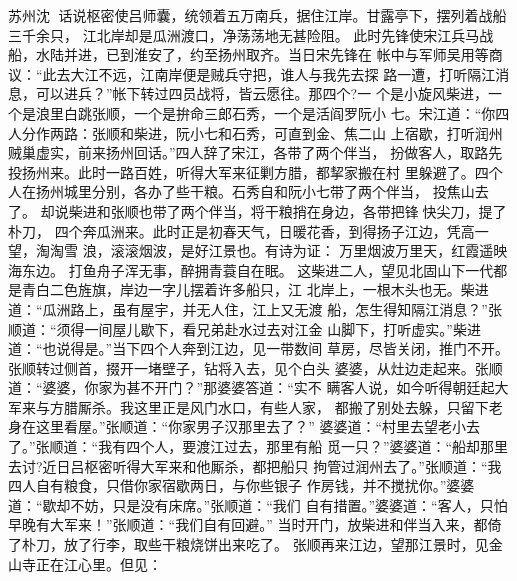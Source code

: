 苏州沈
话说枢密使吕师囊，统领着五万南兵，据住江岸。甘露亭下，摆列着战船三千余只，
江北岸却是瓜洲渡口，净荡荡地无甚险阻。
此时先锋使宋江兵马战船，水陆并进，已到淮安了，约至扬州取齐。当日宋先锋在
帐中与军师吴用等商议：“此去大江不远，江南岸便是贼兵守把，谁人与我先去探
路一遭，打听隔江消息，可以进兵？”帐下转过四员战将，皆云愿往。那四个?一
个是小旋风柴进，一个是浪里白跳张顺，一个是拚命三郎石秀，一个是活阎罗阮小
七。宋江道：“你四人分作两路：张顺和柴进，阮小七和石秀，可直到金、焦二山
上宿歇，打听润州贼巢虚实，前来扬州回话。”四人辞了宋江，各带了两个伴当，
扮做客人，取路先投扬州来。此时一路百姓，听得大军来征剿方腊，都挈家搬在村
里躲避了。四个人在扬州城里分别，各办了些干粮。石秀自和阮小七带了两个伴当，
投焦山去了。
却说柴进和张顺也带了两个伴当，将干粮捎在身边，各带把锋快尖刀，提了朴刀，
四个奔瓜洲来。此时正是初春天气，日暖花香，到得扬子江边，凭高一望，淘淘雪
浪，滚滚烟波，是好江景也。有诗为证：
万里烟波万里天，红霞遥映海东边。
打鱼舟子浑无事，醉拥青蓑自在眠。
这柴进二人，望见北固山下一代都是青白二色旌旗，岸边一字儿摆着许多船只，江
北岸上，一根木头也无。柴进道：“瓜洲路上，虽有屋宇，并无人住，江上又无渡
船，怎生得知隔江消息？”张顺道：“须得一间屋儿歇下，看兄弟赴水过去对江金
山脚下，打听虚实。”柴进道：“也说得是。”当下四个人奔到江边，见一带数间
草房，尽皆关闭，推门不开。张顺转过侧首，掇开一堵壁子，钻将入去，见个白头
婆婆，从灶边走起来。张顺道：“婆婆，你家为甚不开门？”那婆婆答道：“实不
瞒客人说，如今听得朝廷起大军来与方腊厮杀。我这里正是风门水口，有些人家，
都搬了别处去躲，只留下老身在这里看屋。”张顺道：“你家男子汉那里去了？”
婆婆道：“村里去望老小去了。”张顺道：“我有四个人，要渡江过去，那里有船
觅一只？”婆婆道：“船却那里去讨?近日吕枢密听得大军来和他厮杀，都把船只
拘管过润州去了。”张顺道：“我四人自有粮食，只借你家宿歇两日，与你些银子
作房钱，并不搅扰你。”婆婆道：“歇却不妨，只是没有床席。”张顺道：“我们
自有措置。”婆婆道：“客人，只怕早晚有大军来！”张顺道：“我们自有回避。”
当时开门，放柴进和伴当入来，都倚了朴刀，放了行李，取些干粮烧饼出来吃了。
张顺再来江边，望那江景时，见金山寺正在江心里。但见：


